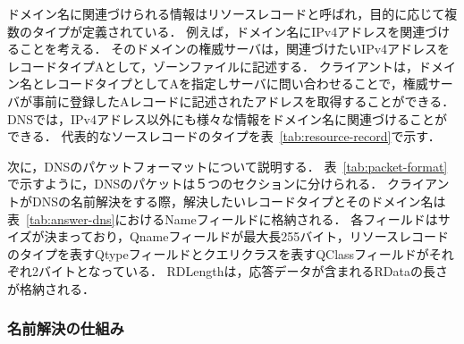 
\newpage
ドメイン名に関連づけられる情報はリソースレコードと呼ばれ，目的に応じて複数のタイプが定義されている．
例えば，ドメイン名にIPv4アドレスを関連づけることを考える．
そのドメインの権威サーバは，関連づけたいIPv4アドレスをレコードタイプAとして，ゾーンファイルに記述する．
クライアントは，ドメイン名とレコードタイプとしてAを指定しサーバに問い合わせることで，権威サーバが事前に登録したAレコードに記述されたアドレスを取得することができる．
DNSでは，IPv4アドレス以外にも様々な情報をドメイン名に関連づけることができる．
代表的なソースレコードのタイプを表~\ref{tab:resource-record}で示す．


次に，DNSのパケットフォーマットについて説明する．
表~\ref{tab:packet-format}で示すように，DNSのパケットは５つのセクションに分けられる．
クライアントがDNSの名前解決をする際，解決したいレコードタイプとそのドメイン名は表~\ref{tab:answer-dns}におけるNameフィールドに格納される．
各フィールドはサイズが決まっており，Qnameフィールドが最大長255バイト，リソースレコードのタイプを表すQtypeフィールドとクエリクラスを表すQClassフィールドがそれぞれ2バイトとなっている．
RDLengthは，応答データが含まれるRDataの長さが格納される．


\subsubsection{名前解決の仕組み}
\label{sec:dns-mechanism}

